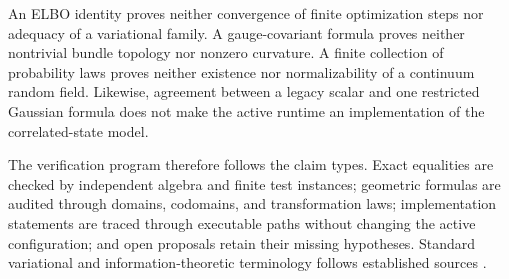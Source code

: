 An ELBO identity proves neither convergence of finite optimization steps nor adequacy of a variational family. A gauge-covariant formula proves neither nontrivial bundle topology nor nonzero curvature. A finite collection of probability laws proves neither existence nor normalizability of a continuum random field. Likewise, agreement between a legacy scalar and one restricted Gaussian formula does not make the active runtime an implementation of the correlated-state model.

The verification program therefore follows the claim types. Exact equalities are checked by independent algebra and finite test instances; geometric formulas are audited through domains, codomains, and transformation laws; implementation statements are traced through executable paths without changing the active configuration; and open proposals retain their missing hypotheses. Standard variational and information-theoretic terminology follows established sources \citep{Kullback1951,Csiszar1967,Bishop2006,Blei2017,Wainwright2008}.
